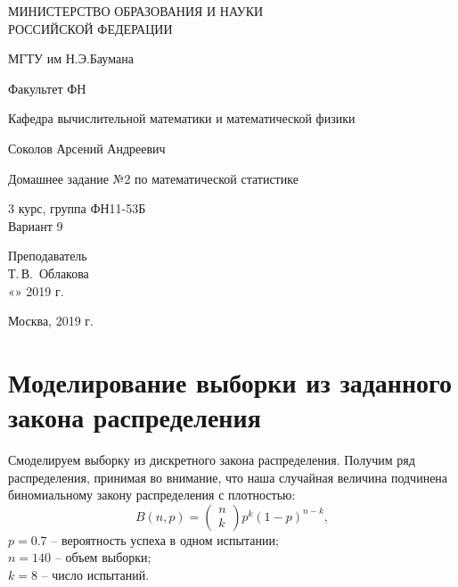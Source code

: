\documentclass[14pt,a4paper]{scrartcl}
\begin{document}
	\begin{titlepage}
	\begin{center}
		\large
		МИНИСТЕРСТВО ОБРАЗОВАНИЯ И НАУКИ\\ РОССИЙСКОЙ ФЕДЕРАЦИИ
		
		\vspace{0.5cm}
		
		МГТУ им Н.Э.Баумана
		\vspace{0.25cm}
		
		Факультет ФН
		
		Кафедра вычислительной математики и математической физики
		\vfill
		
		
		Соколов Арсений Андреевич\\
		\vfill
		
		
		{\LARGE Домашнее задание №2 по математической статистике\\[2mm]
		}
		\bigskip
		
		3 курс, группа ФН11-53Б\\
		Вариант 9
	\end{center}
	\vfill
	
	\newlength{\ML}
	\hfill\begin{minipage}{0.4\textwidth}
		Преподаватель\\
		\underline{\hspace{3cm}} Т.\,В.~Облакова\\
		«\underline{\hspace{0.7cm}}» \underline{\hspace{1.71cm}} 2019 г.
	\end{minipage}%
	\bigskip
	
	
	\vfill
	
	\begin{center}
		Москва, 2019 г.
	\end{center}
\end{titlepage}

\section{Моделирование выборки из заданного закона распределения}

Смоделируем выборку из дискретного закона распределения. Получим ряд распределения, принимая во внимание, что наша случайная величина подчинена биномиальному закону распределения с плотностью:
\begin{equation*}
	B(n,p) = \left(\begin{array}{l}{n} \\ {k}\end{array}\right) p^{k}(1-p)^{n-k},
\end{equation*}
$p = 0.7$ -- вероятность успеха в одном испытании;\\
$n = 140$ -- объем выборки;\\
$k = 8$ -- число испытаний.
\end{document}
